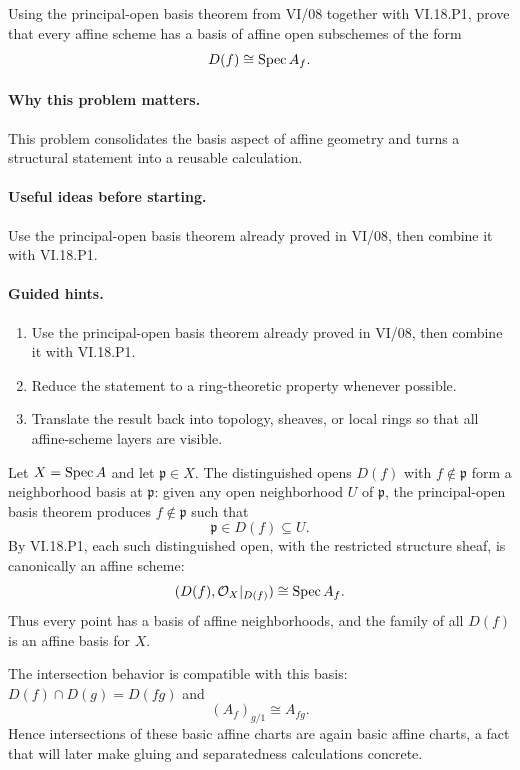 \begin{problem}\label{prob:vi18-p04}
Using the principal-open basis theorem from VI/08 together with VI.18.P1, prove that every affine scheme has a basis of affine open subschemes of the form
\[
D(f)\cong\operatorname{Spec} A_f.
\]
\end{problem}

\ifdefined\FullProblemDossiers
\paragraph{Why this problem matters.}
This problem consolidates the basis aspect of affine geometry and turns a structural statement into a reusable calculation.

\paragraph{Useful ideas before starting.}
Use the principal-open basis theorem already proved in VI/08, then combine it with VI.18.P1.

\paragraph{Guided hints.}
\begin{enumerate}
\item Use the principal-open basis theorem already proved in VI/08, then combine it with VI.18.P1.
\item Reduce the statement to a ring-theoretic property whenever possible.
\item Translate the result back into topology, sheaves, or local rings so that all affine-scheme layers are visible.
\end{enumerate}

\begin{solution}
Let $X=\operatorname{Spec} A$ and let $\mathfrak p\in X$. The distinguished opens $D(f)$ with $f\notin\mathfrak p$ form a neighborhood basis at $\mathfrak p$: given any open neighborhood $U$ of $\mathfrak p$, the principal-open basis theorem produces $f\notin\mathfrak p$ such that
\[
\mathfrak p\in D(f)\subseteq U.
\]
By VI.18.P1, each such distinguished open, with the restricted structure sheaf, is canonically an affine scheme:
\[
(D(f),\mathcal O_X|_{D(f)})\cong\operatorname{Spec} A_f.
\]
Thus every point has a basis of affine neighborhoods, and the family of all $D(f)$ is an affine basis for $X$.

The intersection behavior is compatible with this basis: $D(f)\cap D(g)=D(fg)$ and
\[
(A_f)_{g/1}\cong A_{fg}.
\]
Hence intersections of these basic affine charts are again basic affine charts, a fact that will later make gluing and separatedness calculations concrete.
\end{solution}


